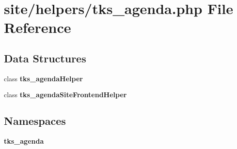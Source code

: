 \section{site/helpers/tks\+\_\+agenda.php File Reference}
\label{site_2helpers_2tks__agenda_8php}
\subsection*{Data Structures}
\begin{DoxyCompactItemize}
\item 
class \textbf{ tks\+\_\+agenda\+Helper}
\item 
class \textbf{ tks\+\_\+agenda\+Site\+Frontend\+Helper}
\end{DoxyCompactItemize}
\subsection*{Namespaces}
\begin{DoxyCompactItemize}
\item 
 \textbf{ tks\+\_\+agenda}
\end{DoxyCompactItemize}
